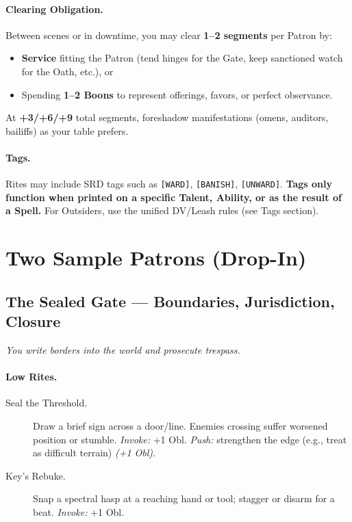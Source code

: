 \documentclass[11pt]{article}
\begin{document}
\paragraph{Clearing Obligation.}
Between scenes or in downtime, you may clear \textbf{1–2 segments} per Patron by:
\begin{itemize}
  \item \textbf{Service} fitting the Patron (tend hinges for the Gate, keep sanctioned watch for the Oath, etc.), or
  \item Spending \textbf{1–2 Boons} to represent offerings, favors, or perfect observance.
\end{itemize}
At \textbf{+3/+6/+9} total segments, foreshadow manifestations (omens, auditors, bailiffs) as your table prefers.

\paragraph{Tags.}
Rites may include SRD tags such as \texttt{[WARD]}, \texttt{[BANISH]}, \texttt{[UNWARD]}. \textbf{Tags only function when printed on a specific Talent, Ability, or as the result of a Spell.} For Outsiders, use the unified DV/Leash rules (see Tags section).


\bigskip

\section{Two Sample Patrons (Drop-In)}

\subsection*{The Sealed Gate — Boundaries, Jurisdiction, Closure}
\textit{You write borders into the world and prosecute trespass.}

\paragraph{Low Rites.}
\begin{description}
  \item[Seal the Threshold.] Draw a brief sign across a door/line. Enemies crossing suffer worsened position or stumble. \emph{Invoke:} +1 Obl. \emph{Push:} strengthen the edge (e.g., treat as difficult terrain) \emph{(+1 Obl)}.
  \item[Key's Rebuke.] Snap a spectral hasp at a reaching hand or tool; stagger or disarm for a beat. \emph{Invoke:} +1 Obl.
\end{description}
\end{document}
